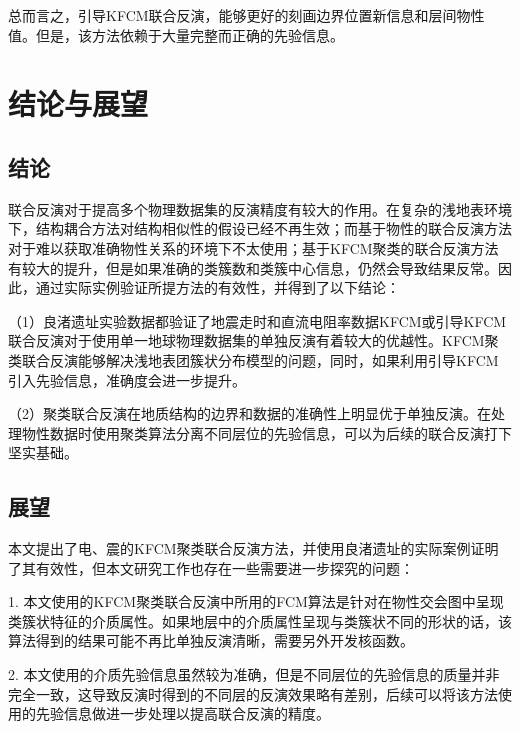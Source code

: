 总而言之，引导KFCM联合反演，能够更好的刻画边界位置新信息和层间物性值。但是，该方法依赖于大量完整而正确的先验信息。

\newpage
\section{结论与展望}

\subsection{结论}

联合反演对于提高多个物理数据集的反演精度有较大的作用。在复杂的浅地表环境下，结构耦合方法对结构相似性的假设已经不再生效；而基于物性的联合反演方法对于难以获取准确物性关系的环境下不太使用；基于KFCM聚类的联合反演方法有较大的提升，但是如果准确的类簇数和类簇中心信息，仍然会导致结果反常。因此，通过实际实例验证所提方法的有效性，并得到了以下结论：

（1）良渚遗址实验数据都验证了地震走时和直流电阻率数据KFCM或引导KFCM联合反演对于使用单一地球物理数据集的单独反演有着较大的优越性。KFCM聚类联合反演能够解决浅地表团簇状分布模型的问题，同时，如果利用引导KFCM引入先验信息，准确度会进一步提升。

（2）聚类联合反演在地质结构的边界和数据的准确性上明显优于单独反演。在处理物性数据时使用聚类算法分离不同层位的先验信息，可以为后续的联合反演打下坚实基础。

\subsection{展望}

本文提出了电、震的KFCM聚类联合反演方法，并使用良渚遗址的实际案例证明了其有效性，但本文研究工作也存在一些需要进一步探究的问题：

1. 本文使用的KFCM聚类联合反演中所用的FCM算法是针对在物性交会图中呈现类簇状特征的介质属性。如果地层中的介质属性呈现与类簇状不同的形状的话，该算法得到的结果可能不再比单独反演清晰，需要另外开发核函数。

2. 本文使用的介质先验信息虽然较为准确，但是不同层位的先验信息的质量并非完全一致，这导致反演时得到的不同层的反演效果略有差别，后续可以将该方法使用的先验信息做进一步处理以提高联合反演的精度。